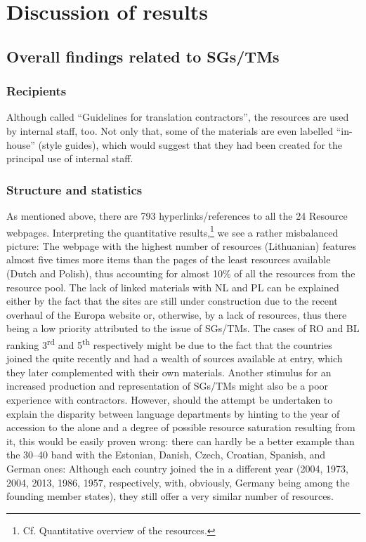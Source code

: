 \documentclass[output=paper]{langsci/langscibook}
\begin{document}
\section{Discussion of results}\label{sec:svoboda:5}

\subsection{Overall findings related to SGs/TMs}\label{sec:svoboda:5.1}

\subsubsection{Recipients}

Although called “Guidelines for translation contractors”, the resources are used by internal staff, too. Not only that, some of the materials are even labelled “in-house” (style guides), which would suggest that they had been created for the principal use of internal staff.

\subsubsection{Structure and statistics}

As mentioned above, there are 793 hyperlinks/references to all the 24  Resource webpages. Interpreting the quantitative results,\footnote{Cf.  Quantitative overview of the resources.} we see a rather misbalanced picture: The webpage with the highest number of resources (Lithuanian) features almost five times more items than the pages of the least resources available (Dutch and Polish), thus accounting for almost 10\% of all the resources from the resource pool. The lack of linked materials with NL and PL can be explained either by the fact that the sites are still under construction due to the recent overhaul of the Europa website or, otherwise, by a lack of resources, thus there being a low priority attributed to the issue of SGs/TMs. The cases of RO and BL ranking 3\textsuperscript{rd} and 5\textsuperscript{th} respectively might be due to the fact that the countries joined the  quite recently and had a wealth of sources available at entry, which they later complemented with their own materials. Another stimulus for an increased production and representation of SGs/TMs might also be a poor experience with contractors. However, should the attempt be undertaken to explain the disparity between language departments by hinting to the year of accession to the  alone and a degree of possible resource saturation resulting from it, this would be easily proven wrong: there can hardly be a better example than the 30–40 band with the Estonian, Danish, Czech, Croatian, Spanish, and German ones: Although each country joined the  in a different year (2004, 1973, 2004, 2013, 1986, 1957, respectively, with, obviously, Germany being among the founding member states), they still offer a very similar number of resources.
\end{document}
